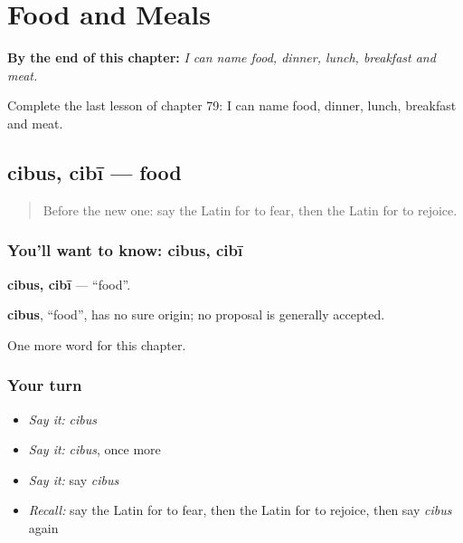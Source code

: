 
\chapter{Food and Meals}
\label{ch:la-food-and-meals}

\begin{chapteropening}
\textbf{By the end of this chapter:} \emph{I can name food, dinner, lunch, breakfast and meat.}

Complete the last lesson of chapter 79: I can name food, dinner, lunch, breakfast and meat.
\end{chapteropening}

\section[cibus, cibī]{cibus, cibī — food}

\label{lesson:LA-C79-cibus}



\begin{quote}
Before the new one: say the Latin for to fear, then the Latin for to rejoice.
\end{quote}

\subsection*{You'll want to know: cibus, cibī}
\textbf{cibus, cibī} — \textquotedblleft{}food\textquotedblright{}.

\begin{cousinweb}
\textbf{cibus}, \textquotedblleft{}food\textquotedblright{}, has no sure origin; no proposal is generally accepted.
\end{cousinweb}

\begin{grammarlens}[title={What you've built}]
One more word for this chapter.
\end{grammarlens}

\subsection*{Your turn}
\begin{itemize}
\raggedright
  \item \emph{Say it:} \emph{cibus}
  \item \emph{Say it:} \emph{cibus}, once more
  \item \emph{Say it:} say \emph{cibus}
  \item \emph{Recall:} say the Latin for to fear, then the Latin for to rejoice, then say \emph{cibus} again
\end{itemize}

